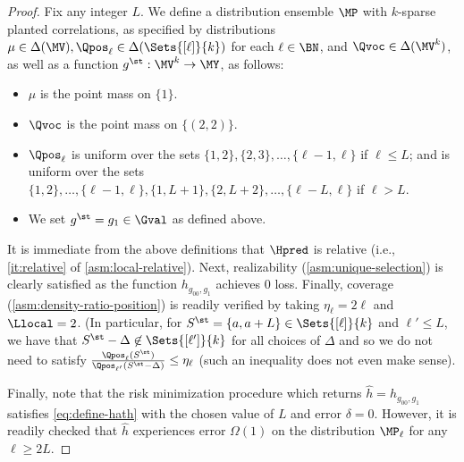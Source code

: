 \documentclass{article}
\begin{document}
\begin{proof}
Fix any integer $L$. We define a distribution ensemble $\MP$ with $k$-sparse planted correlations, as specified by distributions $\mu \in \Delta(\MV), \Qpos_\ell \in \Delta(\Sets{[\ell]}{k})$ for each $\ell \in \BN$, and $\Qvoc \in \Delta(\MV^k)$, as well as a function $g^\st : \MV^k \to \MY$, as follows:
  \begin{itemize}
  \item $\mu$ is the point mass on $\{1 \}$. 
  \item $\Qvoc$ is the point mass on $\{ (2,2) \}$. 
  \item $\Qpos_\ell$ is uniform over the sets $\{1, 2\}, \{2,3\}, \ldots, \{\ell-1, \ell \}$ if $\ell \leq L$; and is uniform over the sets $\{ 1, 2\}, \ldots, \{ \ell-1, \ell \}, \{ 1, L+1 \} , \{2, L+2\}, \ldots, \{\ell - L, \ell \}$ if $\ell > L$.
  \item We set $g^\st = g_{1} \in \Gval$ as defined above. 
  \end{itemize}

  It is immediate from the above definitions that $\Hpred$ is relative (i.e., \cref{it:relative} of \cref{asm:local-relative}). Next, realizability (\cref{asm:unique-selection}) is clearly satisfied as the function $h_{g_{00}, g_{1}}$ achieves $0$ loss. Finally, coverage (\cref{asm:density-ratio-position}) is readily verified by taking $\eta_\ell = 2\ell$ and $\Llocal = 2$. (In particular, for $S^\st = \{ a, a+L \} \in \Sets{[\ell]}{k}$ and $\ell' \leq L$, we have that $S^\st - \Delta\not \in \Sets{[\ell']}{k}$ for all choices of $\Delta$ and so we do not need to satisfy $\frac{\Qpos_\ell(S^\st)}{\Qpos_{\ell'}(S^\st - \Delta)} \leq \eta_\ell$ (such an inequality does not even make sense).

  Finally, note that the risk minimization procedure which returns $\hat h = h_{g_{00}, g_1}$ satisfies  \cref{eq:define-hath} with the chosen value of $L$ and error $\delta = 0$. However, it is readily checked that $\hat h$ experiences error $\Omega(1)$ on the distribution $\MP_\ell$ for any $\ell \geq 2L$.


\end{proof}
\end{document}

